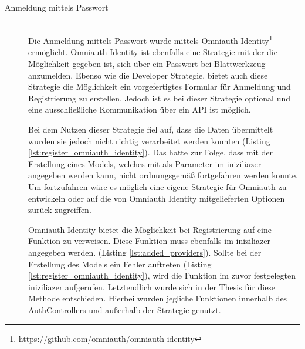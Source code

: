 \begin{description}
	\item[Anmeldung mittels Passwort]\hfill\\
	Die Anmeldung mittels Passwort wurde mittels Omniauth Identity\footnote{\url{https://github.com/omniauth/omniauth-identity}} ermöglicht. Omniauth Identity ist ebenfalls eine Strategie mit der die Möglichkeit gegeben ist, sich über ein Passwort bei Blattwerkzeug anzumelden. Ebenso wie die Developer Strategie, bietet auch diese Strategie die Möglichkeit ein vorgefertigtes Formular für Anmeldung und Registrierung zu erstellen. Jedoch ist es bei dieser Strategie optional und eine ausschließliche Kommunikation über ein API ist möglich.

	Bei dem Nutzen dieser Strategie fiel auf, dass die Daten übermittelt wurden sie jedoch nicht richtig verarbeitet werden konnten (Listing \ref{lst:register_omniauth_identity}). Das hatte zur Folge, dass mit der Erstellung eines Models, welches mit als Parameter im iniziliazer angegeben werden kann, nicht ordnungsgemäß fortgefahren werden konnte. Um fortzufahren wäre es möglich eine eigene Strategie für Omniauth zu entwickeln oder auf die von Omniauth Identity mitgelieferten Optionen zurück zugreiffen.
	
	\begin{minipage}{\textwidth}
		
	\end{minipage}

	Omniauth Identity bietet die Möglichkeit bei Registrierung auf eine Funktion zu verweisen. Diese Funktion muss ebenfalls im iniziliazer angegeben werden. (Listing \ref{lst:added_providers}). Sollte bei der Erstellung des Models ein Fehler auftreten (Listing \ref{lst:register_omniauth_identity}), wird die Funktion im zuvor festgelegten iniziliazer aufgerufen. Letztendlich wurde sich in der Thesis für diese Methode entschieden. Hierbei wurden jegliche Funktionen innerhalb des AuthControllers und außerhalb der Strategie genutzt.


\end{description}
